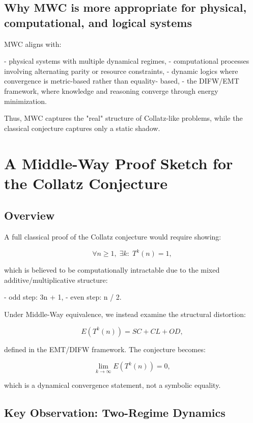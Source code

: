 \documentclass[11pt]{article}
\theoremstyle{definition}
\theoremstyle{remark}
\begin{document}
\subsection{Why MWC is more appropriate for physical, computational,
and logical systems}

MWC aligns with:

- physical systems with multiple dynamical regimes,
- computational processes involving alternating parity or resource
  constraints,
- dynamic logics where convergence is metric-based rather than equality-
  based,
- the DIFW/EMT framework, where knowledge and reasoning converge through
  energy minimization.

Thus, MWC captures the "real" structure of Collatz-like problems, while
the classical conjecture captures only a static shadow.


\section{A Middle-Way Proof Sketch for the Collatz Conjecture}

\subsection{Overview}

A full classical proof of the Collatz conjecture would require showing:

\[
  \forall n \ge 1,\; \exists k:\; T^{k}(n)=1,
\]

which is believed to be computationally intractable due to the mixed
additive/multiplicative structure:

- odd step: 3n + 1,
- even step: n / 2.

Under Middle-Way equivalence, we instead examine the structural
distortion:

\[
  E(T^k(n)) = SC + CL + OD,
\]

defined in the EMT/DIFW framework.  
The conjecture becomes:

\[
  \lim_{k \to \infty} E(T^k(n)) = 0,
\]

which is a dynamical convergence statement, not a symbolic equality.

\subsection{Key Observation: Two-Regime Dynamics}
\end{document}
